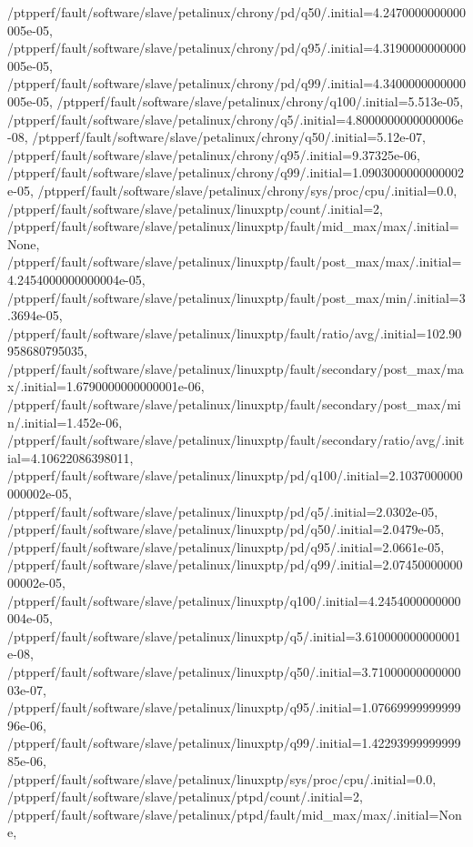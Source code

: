{    /ptpperf/fault/software/slave/petalinux/chrony/pd/q50/.initial=4.2470000000000005e-05,
    /ptpperf/fault/software/slave/petalinux/chrony/pd/q95/.initial=4.3190000000000005e-05,
    /ptpperf/fault/software/slave/petalinux/chrony/pd/q99/.initial=4.3400000000000005e-05,
    /ptpperf/fault/software/slave/petalinux/chrony/q100/.initial=5.513e-05,
    /ptpperf/fault/software/slave/petalinux/chrony/q5/.initial=4.8000000000000006e-08,
    /ptpperf/fault/software/slave/petalinux/chrony/q50/.initial=5.12e-07,
    /ptpperf/fault/software/slave/petalinux/chrony/q95/.initial=9.37325e-06,
    /ptpperf/fault/software/slave/petalinux/chrony/q99/.initial=1.0903000000000002e-05,
    /ptpperf/fault/software/slave/petalinux/chrony/sys/proc/cpu/.initial=0.0,
    /ptpperf/fault/software/slave/petalinux/linuxptp/count/.initial=2,
    /ptpperf/fault/software/slave/petalinux/linuxptp/fault/mid_max/max/.initial=None,
    /ptpperf/fault/software/slave/petalinux/linuxptp/fault/post_max/max/.initial=4.2454000000000004e-05,
    /ptpperf/fault/software/slave/petalinux/linuxptp/fault/post_max/min/.initial=3.3694e-05,
    /ptpperf/fault/software/slave/petalinux/linuxptp/fault/ratio/avg/.initial=102.90958680795035,
    /ptpperf/fault/software/slave/petalinux/linuxptp/fault/secondary/post_max/max/.initial=1.6790000000000001e-06,
    /ptpperf/fault/software/slave/petalinux/linuxptp/fault/secondary/post_max/min/.initial=1.452e-06,
    /ptpperf/fault/software/slave/petalinux/linuxptp/fault/secondary/ratio/avg/.initial=4.10622086398011,
    /ptpperf/fault/software/slave/petalinux/linuxptp/pd/q100/.initial=2.1037000000000002e-05,
    /ptpperf/fault/software/slave/petalinux/linuxptp/pd/q5/.initial=2.0302e-05,
    /ptpperf/fault/software/slave/petalinux/linuxptp/pd/q50/.initial=2.0479e-05,
    /ptpperf/fault/software/slave/petalinux/linuxptp/pd/q95/.initial=2.0661e-05,
    /ptpperf/fault/software/slave/petalinux/linuxptp/pd/q99/.initial=2.0745000000000002e-05,
    /ptpperf/fault/software/slave/petalinux/linuxptp/q100/.initial=4.2454000000000004e-05,
    /ptpperf/fault/software/slave/petalinux/linuxptp/q5/.initial=3.610000000000001e-08,
    /ptpperf/fault/software/slave/petalinux/linuxptp/q50/.initial=3.7100000000000003e-07,
    /ptpperf/fault/software/slave/petalinux/linuxptp/q95/.initial=1.0766999999999996e-06,
    /ptpperf/fault/software/slave/petalinux/linuxptp/q99/.initial=1.4229399999999985e-06,
    /ptpperf/fault/software/slave/petalinux/linuxptp/sys/proc/cpu/.initial=0.0,
    /ptpperf/fault/software/slave/petalinux/ptpd/count/.initial=2,
    /ptpperf/fault/software/slave/petalinux/ptpd/fault/mid_max/max/.initial=None,
}
